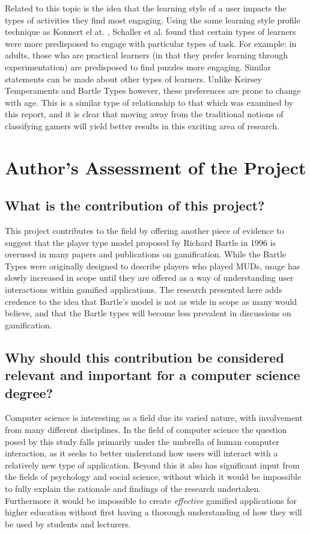 \documentclass[12pt,a4paper,twoside]{report}
\begin{document}
Related to this topic is the idea that the learning style of a user impacts the types of activities they find most engaging. Using the same learning style profile technique as Konnert el at. \cite{konertmodeling}, Schaller et al. \cite{one-size} found that certain types of learners were more predisposed to engage with particular types of task. For example: in adults, those who are practical learners (in that they prefer learning through experimentation) are predisposed to find puzzles more engaging. Similar statements can be made about other types of learners. Unlike Keirsey Temperaments and Bartle Types however, these preferences are prone to change with age. This is a similar type of relationship to that which was examined by this report, and it is clear that moving away from the traditional notions of classifying gamers will yield better results in this exciting area of research.

\chapter{Author's Assessment of the Project}
\label{sec:issues}

\section{What is the contribution of this project?}
This project contributes to the field by offering another piece of evidence to suggest that the player type model proposed by Richard Bartle in 1996 is overused in many papers and publications on gamification. While the Bartle Types were originally designed to describe players who played MUDs, usage has slowly increased in scope until they are offered as a way of understanding user interactions within gamified applications. The research presented here adds credence to the idea that Bartle's model is not as wide in scope as many would believe, and that the Bartle types will become less prevalent in discussions on gamification.

\section{Why should this contribution be considered relevant and important for a computer science degree?}
Computer science is interesting as a field due its varied nature, with involvement from many different disciplines. In the field of computer science the question posed by this study falls primarily under the umbrella of human computer interaction, as it seeks to better understand how users will interact with a relatively new type of application. Beyond this it also has significant input from the fields of psychology and social science, without which it would be impossible to fully explain the rationale and findings of the research undertaken. Furthermore it would be impossible to create \textit{effective} gamified applications for higher education without first having a thorough understanding of how they will be used by students and lecturers.
\end{document}
